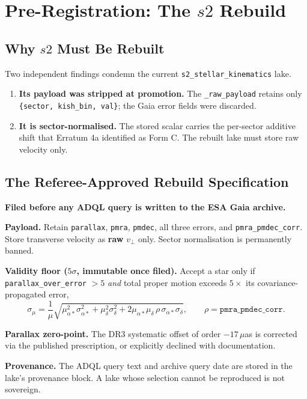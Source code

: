 \documentclass[11pt, letterpaper, openany]{book}
\begin{document}
\chapter{Pre-Registration: The $s2$ Rebuild}

\section{Why $s2$ Must Be Rebuilt}

Two independent findings condemn the current \texttt{s2\_stellar\_kinematics} lake.

\begin{enumerate}
    \item \textbf{Its payload was stripped at promotion.} The \texttt{\_raw\_payload} retains only
          \texttt{\{sector, kish\_bin, val\}}; the Gaia error fields were discarded. 
    \item \textbf{It is sector-normalised.} The stored scalar carries the per-sector additive shift
          that Erratum 4a identified as Form C. The rebuilt lake must store raw velocity only.
\end{enumerate}

\section{The Referee-Approved Rebuild Specification}

\begin{predictionbox}
\textbf{Filed before any ADQL query is written to the ESA Gaia archive.}

\medskip
\textbf{Payload.} Retain \texttt{parallax}, \texttt{pmra}, \texttt{pmdec}, all three errors, and
\texttt{pmra\_pmdec\_corr}. Store transverse velocity as \textbf{raw} $v_\perp$ only. Sector
normalisation is permanently banned.

\medskip
\textbf{Validity floor ($5\sigma$, immutable once filed).} Accept a star only if
\texttt{parallax\_over\_error} $> 5$ \emph{and} total proper motion exceeds $5\times$ its
covariance-propagated error,
\[
\sigma_\mu = \frac{1}{\mu}\sqrt{\mu_{\alpha*}^2\sigma_{\alpha*}^2 + \mu_\delta^2\sigma_\delta^2
+ 2\mu_{\alpha*}\mu_\delta\,\rho\,\sigma_{\alpha*}\sigma_\delta},
\qquad \rho = \texttt{pmra\_pmdec\_corr}.
\]

\medskip
\textbf{Parallax zero-point.} The DR3 systematic offset of order $-17\,\mu$as is corrected via the
published prescription, or explicitly declined with documentation. 

\medskip
\textbf{Provenance.} The ADQL query text and archive query date are stored in the lake's
provenance block. A lake whose selection cannot be reproduced is not sovereign.
\end{predictionbox}
\end{document}

